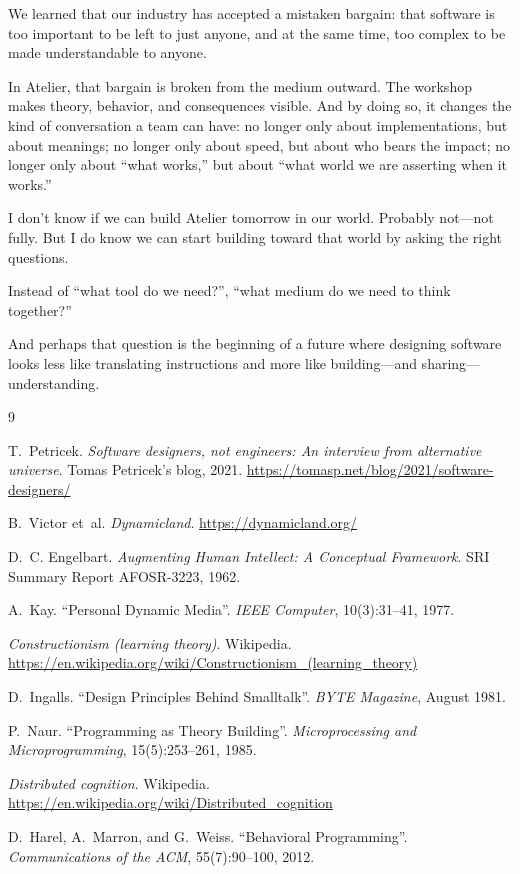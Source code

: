 \documentclass[11pt,a4paper]{article}
\begin{document}
We learned that our industry has accepted a mistaken bargain: that software
is too important to be left to just anyone, and at the same time, too complex
to be made understandable to anyone.

In Atelier, that bargain is broken from the medium outward. The workshop
makes theory, behavior, and consequences visible. And by doing so, it changes
the kind of conversation a team can have: no longer only about
implementations, but about meanings; no longer only about speed, but about
who bears the impact; no longer only about ``what works,'' but about ``what
world we are asserting when it works.''

I don't know if we can build Atelier tomorrow in our world. Probably not---not
fully. But I do know we can start building toward that world by asking the
right questions.

Instead of ``what tool do we need?'', ``what medium do we need to think
together?''

And perhaps that question is the beginning of a future where designing
software looks less like translating instructions and more like
building---and sharing---understanding.

\begin{thebibliography}{9}

T.~Petricek.
\emph{Software designers, not engineers: An interview from alternative
universe}. Tomas Petricek's blog, 2021.
\url{https://tomasp.net/blog/2021/software-designers/}

B.~Victor et~al.
\emph{Dynamicland}.
\url{https://dynamicland.org/}

D.~C. Engelbart.
\emph{Augmenting Human Intellect: A Conceptual Framework}.
SRI Summary Report AFOSR-3223, 1962.

A.~Kay.
``Personal Dynamic Media''.
\emph{IEEE Computer}, 10(3):31--41, 1977.

\emph{Constructionism (learning theory)}. Wikipedia.
\url{https://en.wikipedia.org/wiki/Constructionism_(learning_theory)}

D.~Ingalls.
``Design Principles Behind Smalltalk''.
\emph{BYTE Magazine}, August 1981.

P.~Naur.
``Programming as Theory Building''.
\emph{Microprocessing and Microprogramming}, 15(5):253--261, 1985.

\emph{Distributed cognition}. Wikipedia.
\url{https://en.wikipedia.org/wiki/Distributed_cognition}

D.~Harel, A.~Marron, and G.~Weiss.
``Behavioral Programming''.
\emph{Communications of the ACM}, 55(7):90--100, 2012.

\end{thebibliography}
\end{document}
